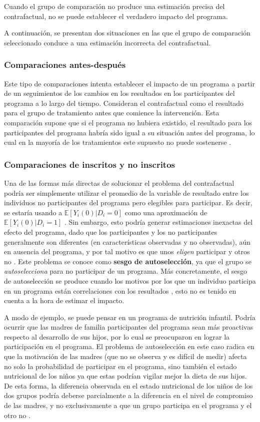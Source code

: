 \documentclass[../../main.tex]{subfiles}
\begin{document}
Cuando el grupo de comparación no produce una estimación precisa del contrafactual, no se puede establecer el verdadero impacto del programa.

A continuación, se presentan dos situaciones en las que el grupo de comparación seleccionado conduce a una estimación incorrecta del contrafactual.

\subsubsection{Comparaciones antes-después}
Este tipo de comparaciones intenta establecer el impacto de un programa a partir de un seguimientos de los cambios en los resultados en los participantes del programa a lo largo del tiempo. Consideran el contrafactual como el resultado para el grupo de tratamiento antes que comience la intervención. Esta comparación supone que si el programa no hubiera existido, el resultado para los participantes del programa habría sido igual a su situación antes del programa, lo cual en la mayoría de los tratamientos este supuesto no puede sostenerse \cite{gertler-2016}.

\subsubsection{Comparaciones de inscritos y no inscritos}
Una de las formas más directas de solucionar el problema del contrafactual podría ser simplemente utilizar el promedio de la variable de resultado entre los individuos no participantes del programa pero elegibles para participar. Es decir, se estaría usando a \(\mathbb{E} \left[Y_i(0)|D_i=0\right]\) como una aproximación de \(\mathbb{E} \left[Y_i(0)|D_i=1\right]\) \cite{bernal}. Sin embargo, esto podría generar estimaciones inexactas del efecto del programa, dado que los participantes y los no participantes generalmente son diferentes (en características observadas y no observadas), aún en ausencia del programa, y por tal motivo es que unos \textit{eligen} participar y otros no \cite{bernal}. Este problema se conoce como \textbf{sesgo de autoselección}, ya que el grupo se \textit{autoselecciona} para no participar de un programa. Más concretamente, el sesgo de autoselección se produce cuando los motivos por los que un individuo participa en un programa están correlaciones con los resultados \cite{gertler-2016}, esto no es tenido en cuenta a la hora de estimar el impacto.

A modo de ejemplo, se puede pensar en un programa de nutrición infantil. Podría ocurrir que las madres de familia participantes del programa sean más proactivas respecto al desarrollo de sus hijos, por lo cual se preocuparon en lograr la participación en el programa. El problema de autoselección en este caso radica en que la motivación de las madres (que no se observa y es difícil de medir) afecta no solo la probabilidad de participar en el programa, sino también el estado nutricional de los niños ya que estas podrían vigilar mejor la dieta de sus hijos. De esta forma, la diferencia observada en el estado nutricional de los niños de los dos grupos podría deberse parcialmente a la diferencia en el nivel de compromiso de las madres, y no exclusivamente a que un grupo participa en el programa y el otro no \cite{bernal}.
\end{document}
